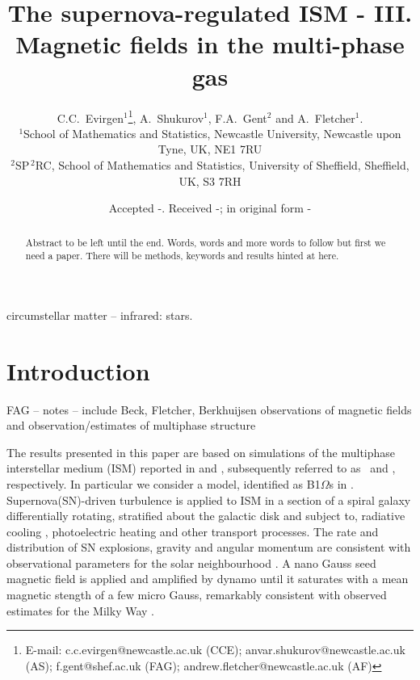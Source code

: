 \documentclass[useAMS,usenatbib]{mn2e}
\title[The supernova-regulated ISM - III. Magnetic fields in the multi-phase gas]{The supernova-regulated ISM - III. Magnetic fields in the multi-phase gas}
\author[C. C.~Evirgen, A.~Shukurov, F.A. Gent and A.~Fletcher]{C.C.~Evirgen$^{1}$\thanks{E-mail:
c.c.evirgen@newcastle.ac.uk (CCE); anvar.shukurov@newcastle.ac.uk (AS); 
f.gent@shef.ac.uk (FAG); andrew.fletcher@newcastle.ac.uk (AF)}, A.~Shukurov$^{1}$, F.A.~Gent$^{2}$ and A.~Fletcher$^{1}$.\\%
$^{1}$School of Mathematics and Statistics, Newcastle University,
Newcastle upon Tyne, UK, NE1 7RU\\
$^{2}$SP$^{\,2}$\!RC, School of Mathematics and Statistics, University of Sheffield, 
Sheffield, UK, S3 7RH}
\begin{document}
\newcommand{\bvec}[1]{\boldsymbol{#1}}
\newcommand{\avg}[1]{\left<\bvec{#1}\right>_{l}}
\date{Accepted -. Received -; in original form -}

\pagerange{\pageref{firstpage}--\pageref{lastpage}} 

\maketitle

\label{firstpage}

\begin{abstract}
Abstract to be left until the end. Words, words and more words to follow but first we need a paper. There will be methods, keywords and results hinted at here. 
\end{abstract}

\begin{keywords}
circumstellar matter -- infrared: stars.
\end{keywords}

\section{Introduction}

FAG -- notes -- include Beck, Fletcher, Berkhuijsen observations of magnetic 
fields \citep{2013AN....334..548B, MNR18065} and observation/estimates of multiphase structure 
\citep{CS74,MO77}

The results presented in this paper are based on simulations of the multiphase 
interstellar medium (ISM) reported in \citet{GSFSM13} and \citet{GSSFM13}, %
subsequently referred to as \HD\, and \MHD, respectively.
In particular we consider a model, identified as B1$\Omega$s in \MHD.
Supernova(SN)-driven turbulence is applied to ISM in a section of a spiral
galaxy differentially rotating, stratified about the galactic disk and subject
to, radiative cooling \citep{Sarazin87,Wolfire95}, photoelectric heating
\citep{Wolfire95} and other transport processes.
The rate and distribution of SN explosions, gravity \citep{Kuijken89} and 
angular momentum are consistent with observational parameters for the solar
neighbourhood \citep{F01}.
A nano Gauss seed magnetic field is applied and amplified by dynamo until it
saturates with a mean magnetic stength of a few micro Gauss, remarkably 
consistent with observed estimates for the Milky Way \citep{dummy}.
\end{document}
